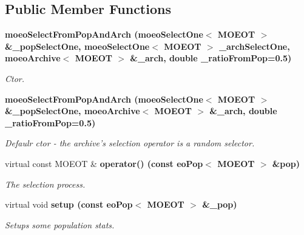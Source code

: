 \subsection*{Public Member Functions}
\begin{CompactItemize}
\item 
\bf{moeo\-Select\-From\-Pop\-And\-Arch} (\bf{moeo\-Select\-One}$<$ MOEOT $>$ \&\_\-pop\-Select\-One, \bf{moeo\-Select\-One}$<$ MOEOT $>$ \_\-arch\-Select\-One, \bf{moeo\-Archive}$<$ MOEOT $>$ \&\_\-arch, double \_\-ratio\-From\-Pop=0.5)
\begin{CompactList}\small\item\em Ctor. \item\end{CompactList}\item 
\bf{moeo\-Select\-From\-Pop\-And\-Arch} (\bf{moeo\-Select\-One}$<$ MOEOT $>$ \&\_\-pop\-Select\-One, \bf{moeo\-Archive}$<$ MOEOT $>$ \&\_\-arch, double \_\-ratio\-From\-Pop=0.5)
\begin{CompactList}\small\item\em Defaulr ctor - the archive's selection operator is a random selector. \item\end{CompactList}\item 
virtual const MOEOT \& \bf{operator()} (const \bf{eo\-Pop}$<$ MOEOT $>$ \&pop)\label{classmoeoSelectFromPopAndArch_7b763aef8e25f205159b69b3f746c942}

\begin{CompactList}\small\item\em The selection process. \item\end{CompactList}\item 
virtual void \bf{setup} (const \bf{eo\-Pop}$<$ MOEOT $>$ \&\_\-pop)\label{classmoeoSelectFromPopAndArch_70180aeaa5d647a720276c82b7a0b111}

\begin{CompactList}\small\item\em Setups some population stats. \item\end{CompactList}\end{CompactItemize}

